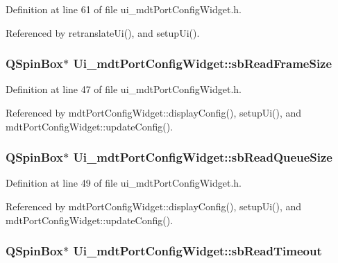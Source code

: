 Definition at line 61 of file ui\-\_\-mdt\-Port\-Config\-Widget.\-h.



Referenced by retranslate\-Ui(), and setup\-Ui().

\hypertarget{class_ui__mdt_port_config_widget_a4488f322a2a11187cee4f229dbb78aac}{
\subsubsection[{sb\-Read\-Frame\-Size}]{\setlength{\rightskip}{0pt plus 5cm}Q\-Spin\-Box$\ast$ Ui\-\_\-mdt\-Port\-Config\-Widget\-::sb\-Read\-Frame\-Size}}\label{class_ui__mdt_port_config_widget_a4488f322a2a11187cee4f229dbb78aac}


Definition at line 47 of file ui\-\_\-mdt\-Port\-Config\-Widget.\-h.



Referenced by mdt\-Port\-Config\-Widget\-::display\-Config(), setup\-Ui(), and mdt\-Port\-Config\-Widget\-::update\-Config().

\hypertarget{class_ui__mdt_port_config_widget_ae685d5d2ed082b55c0dab1be72a5cf7c}{
\subsubsection[{sb\-Read\-Queue\-Size}]{\setlength{\rightskip}{0pt plus 5cm}Q\-Spin\-Box$\ast$ Ui\-\_\-mdt\-Port\-Config\-Widget\-::sb\-Read\-Queue\-Size}}\label{class_ui__mdt_port_config_widget_ae685d5d2ed082b55c0dab1be72a5cf7c}


Definition at line 49 of file ui\-\_\-mdt\-Port\-Config\-Widget.\-h.



Referenced by mdt\-Port\-Config\-Widget\-::display\-Config(), setup\-Ui(), and mdt\-Port\-Config\-Widget\-::update\-Config().

\hypertarget{class_ui__mdt_port_config_widget_a108c450db9637fec5627512417954f67}{
\subsubsection[{sb\-Read\-Timeout}]{\setlength{\rightskip}{0pt plus 5cm}Q\-Spin\-Box$\ast$ Ui\-\_\-mdt\-Port\-Config\-Widget\-::sb\-Read\-Timeout}}\label{class_ui__mdt_port_config_widget_a108c450db9637fec5627512417954f67}


